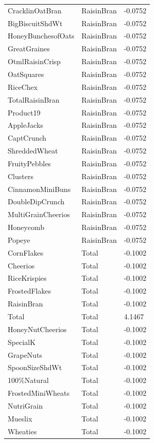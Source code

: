 \begin{table}[!htbp]
\begin{tabular}{lll}
\\
CracklinOatBran & RaisinBran & -0.0752
\\
BigBiscuitShdWt & RaisinBran & -0.0752
\\
HoneyBunchesofOats & RaisinBran & -0.0752
\\
GreatGraines & RaisinBran & -0.0752
\\
OtmlRaisinCrisp & RaisinBran & -0.0752
\\
OatSquares & RaisinBran & -0.0752
\\
RiceChex & RaisinBran & -0.0752
\\
TotalRaisinBran & RaisinBran & -0.0752
\\
Product19 & RaisinBran & -0.0752
\\
AppleJacks & RaisinBran & -0.0752
\\
CaptCrunch & RaisinBran & -0.0752
\\
ShreddedWheat & RaisinBran & -0.0752
\\
FruityPebbles & RaisinBran & -0.0752
\\
Clusters & RaisinBran & -0.0752
\\
CinnamonMiniBuns & RaisinBran & -0.0752
\\
DoubleDipCrunch & RaisinBran & -0.0752
\\
MultiGrainCheerios & RaisinBran & -0.0752
\\
Honeycomb & RaisinBran & -0.0752
\\
Popeye & RaisinBran & -0.0752
\\
CornFlakes & Total & -0.1002
\\
Cheerios & Total & -0.1002
\\
RiceKrispies & Total & -0.1002
\\
FrostedFlakes & Total & -0.1002
\\
RaisinBran & Total & -0.1002
\\
Total & Total & 4.1467
\\
HoneyNutCheerios & Total & -0.1002
\\
SpecialK & Total & -0.1002
\\
GrapeNuts & Total & -0.1002
\\
SpoonSizeShdWt & Total & -0.1002
\\
100\%Natural & Total & -0.1002
\\
FrostedMiniWheats & Total & -0.1002
\\
NutriGrain & Total & -0.1002
\\
Mueslix & Total & -0.1002
\\
Wheaties & Total & -0.1002
\\

\end{tabular}
\end{table}
